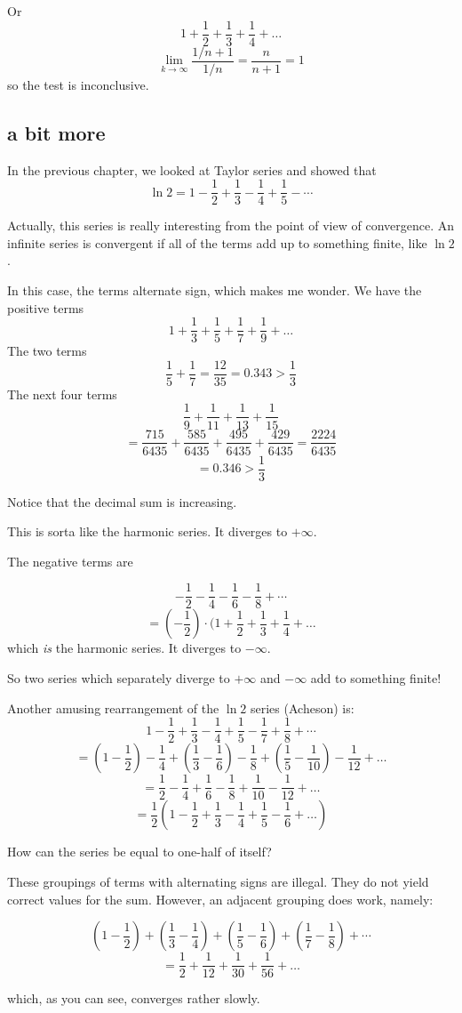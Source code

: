 \documentclass[11pt, oneside]{article}
\begin{document}
Or
\[ 1 + \frac{1}{2} + \frac{1}{3} + \frac{1}{4} + \dots \]
\[ \lim_{k \rightarrow \infty} \frac{1/n+1}{1/n} = \frac{n}{n+1} = 1 \]
so the test is inconclusive.

\subsection*{a bit more}
In the previous chapter, we looked at Taylor series and showed that
\[ \ln 2 = 1 - \frac{1}{2} + \frac{1}{3} - \frac{1}{4} + \frac{1}{5} - \cdots \]

Actually, this series is really interesting from the point of view of convergence.  An infinite series is convergent if all of the terms add up to something finite, like $\ln 2$.

In this case, the terms alternate sign, which makes me wonder.  We have the positive terms
\[ 1 + \frac{1}{3} + \frac{1}{5} + \frac{1}{7} + \frac{1}{9} +  \dots \]
The two terms
\[  \frac{1}{5} + \frac{1}{7} = \frac{12}{35} = 0.343 > \frac{1}{3} \]
The next four terms
\[ \frac{1}{9} + \frac{1}{11} + \frac{1}{13} + \frac{1}{15}  \]
\[ =  \frac{715}{6435} + \frac{585}{6435} + \frac{495}{6435} + \frac{429}{6435} = \frac{2224}{6435} \]
\[ = 0.346 > \frac{1}{3} \]

Notice that the decimal sum is increasing.

This is sorta like the harmonic series.  It diverges to $+ \infty$.

The negative terms are

\[ - \frac{1}{2} - \frac{1}{4} - \frac{1}{6} - \frac{1}{8} + \cdots \]
\[ = (-\frac{1}{2}) \cdot (1 + \frac{1}{2} + \frac{1}{3} + \frac{1}{4} + \dots \]
which \emph{is} the harmonic series.  It diverges to $- \infty$.

So two series which separately diverge to $+ \infty$ and  $- \infty$ add to something finite!

Another amusing rearrangement of the $\ln 2$ series (Acheson) is:
\[ 1 - \frac{1}{2} + \frac{1}{3} - \frac{1}{4} + \frac{1}{5} - \frac{1}{7} + \frac{1}{8} +  \cdots \]
\[ = (1 - \frac{1}{2}) - \frac{1}{4} + (\frac{1}{3} - \frac{1}{6}) - \frac{1}{8} + (\frac{1}{5} - \frac{1}{10}) - \frac{1}{12} + \dots \]
\[ = \frac{1}{2} - \frac{1}{4} + \frac{1}{6} - \frac{1}{8} + \frac{1}{10} - \frac{1}{12} + \dots \]
\[ = \frac{1}{2} (1 - \frac{1}{2} + \frac{1}{3} - \frac{1}{4} + \frac{1}{5} - \frac{1}{6} + \dots) \]

How can the series be equal to one-half of itself?

These groupings of terms with alternating signs are illegal.  They do not yield correct values for the sum.  However, an adjacent grouping does work, namely:

\[ (1 - \frac{1}{2}) + (\frac{1}{3} - \frac{1}{4}) + (\frac{1}{5} - \frac{1}{6}) + (\frac{1}{7} - \frac{1}{8}) +   \cdots \]
\[ = \frac{1}{2} + \frac{1}{12} + \frac{1}{30} + \frac{1}{56} + \dots \]

which, as you can see, converges rather slowly.
\end{document}
